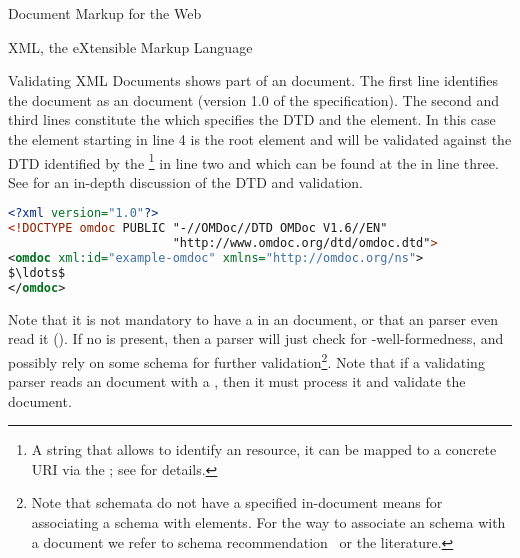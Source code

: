 \begin{omgroup}[id=markup-web]{Document Markup for the Web}
\begin{omgroup}[id=xml]{XML, the eXtensible Markup Language}
\begin{omgroup}[id=xml-validation]{Validating XML Documents}
  {} shows part of an {\omdoc} document. The first line identifies the
  document as an {\xml} document (version 1.0 of the {\xml} specification).  The second
  and third lines constitute the {} which specifies
  the DTD and the {} element. In this case the {}
  element starting in line 4 is the root element and will be validated against the DTD
  identified by the {}\footnote{A string that allows to
    identify an {\xml} resource, it can be mapped to a concrete URI via the
    ; see {} for details.} in line two
  and which can be found at the {} in line three. See {}
  for an in-depth discussion of the {\omdoc} DTD and validation.

\begin{lstlisting}[label=lst:xml-dtd,language=XML,morekeywords={omdoc},mathescape,
  caption={The Structure of an {\xml} Document with DTD},
  index={xml,DOCTYPE,omdoc}
  index={[2]xmlns,xmlns:xsi,xsi:schemaLocation}]
<?xml version="1.0"?> 
<!DOCTYPE omdoc PUBLIC "-//OMDoc//DTD OMDoc V1.6//EN"
                       "http://www.omdoc.org/dtd/omdoc.dtd"> 
<omdoc xml:id="example-omdoc" xmlns="http://omdoc.org/ns"> 
$\ldots$
</omdoc>
\end{lstlisting}
  Note that it is not mandatory to have a {} in an
  {\xml} document, or that an {\xml} parser even read it (). If no
  {} is present, then a parser will just check for
  {\xml}-well-formedness, and possibly rely on some schema for further
  validation\footnote{Note that {\relaxng} schemata do not have a specified in-document
    means for associating a schema with elements. For the way to associate an {\xml}
    schema with a document we refer to {\xml} schema recommendation~\cite{XML:Schema} or
    the {\xml} literature.}.  Note that if a validating parser reads an {\xml} document
  with a {}, then it must process it and validate the
  document.


\end{omgroup}
\end{omgroup}
\end{omgroup}
